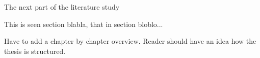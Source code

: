 The next part of the literature study 



This is seen section blabla, that in section bloblo...

Have to add a chapter by chapter overview. Reader should have an idea how the thesis is structured.



